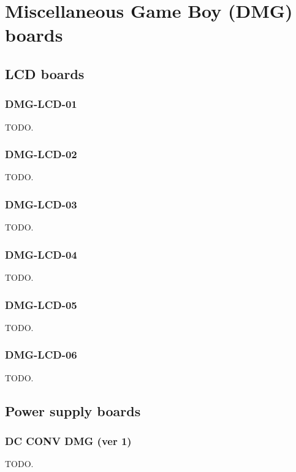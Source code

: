 \chapter{Miscellaneous Game Boy (DMG) boards}

\section{LCD boards}

\subsection{DMG-LCD-01}

TODO.

\subsection{DMG-LCD-02}

TODO.

\subsection{DMG-LCD-03}

TODO.

\subsection{DMG-LCD-04}

TODO.

\subsection{DMG-LCD-05}

TODO.

\subsection{DMG-LCD-06}

TODO.

\section{Power supply boards}

\subsection{DC CONV DMG (ver 1)}

TODO.

